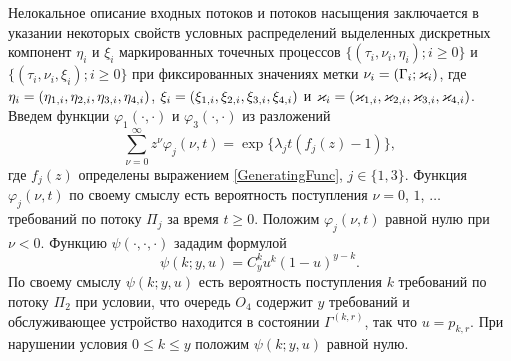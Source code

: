 \documentclass[a4paper,twoside]{article}
\theoremstyle{theorem}
\theoremstyle{remark}
\renewcommand*{\hm}[1]{#1\nobreak\discretionary{}%
	{\hbox{$\mathsurround=0pt #1$}}{}}%
\begin{document}
Нелокальное описание входных потоков и потоков насыщения заключается  в указании некоторых свойств условных распределений выделенных дискретных компонент $\eta_i$ и $\xi_i$ маркированных точечных процессов \linebreak $\{(\tau_i, \nu_i, \eta_i); i\geqslant 0\}$ и $\{(\tau_i, \nu_i, \xi_i); i\geqslant 0\}$ при фиксированных значениях метки $\nu_i \hm= (\Gamma_i;\varkappa_i)$, где $\eta_i\hm=(\eta_{1,i}, \eta_{2,i}, \eta_{3,i}, \eta_{4,i})$, $\xi_i \hm= (\xi_{1,i}, \xi_{2,i}, \xi_{3,i}, \xi_{4,i})$ и $\varkappa_i \hm= (\varkappa_{1,i},\varkappa_{2,i},\varkappa_{3,i},\varkappa_{4,i})$. 
Введем функции $\varphi_1(\cdot,\cdot)$ и $\varphi_3(\cdot,\cdot)$ из разложений 
\begin{equation*}
\sum_{\nu=0}^{\infty} z^\nu\varphi_j(\nu,t) = \exp\{\lambda_j t (f_j(z)-1)\},
\end{equation*}
где $f_j(z)$ определены выражением \eqref{GeneratingFunc}, $j \in \{1,3\}$. Функция $\varphi_j(\nu,t)$ по своему смыслу есть вероятность поступления $\nu=0$, $1$, $\ldots$ требований по потоку $\Pi_j$ за время $t \geqslant 0$. Положим $\varphi_j(\nu,t)$ равной нулю при $\nu < 0$. Функцию $\psi(\cdot,\cdot,\cdot)$ зададим формулой
\begin{equation*}
\psi(k;y,u)=C_y^k u^k (1-u)^{y-k}.	
\end{equation*}
По своему смыслу $\psi(k;y,u)$ есть вероятность поступления $k$ требований по потоку $\Pi_2$ при условии, что очередь $O_4$ содержит $y$ требований и обслуживающее устройство находится в состоянии $\Gamma^{(k,r)}$, так что $u=p_{k,r}$. При нарушении условия $ 0\leqslant k \leqslant y$ положим $\psi(k;y,u)$ равной нулю.
\end{document}

